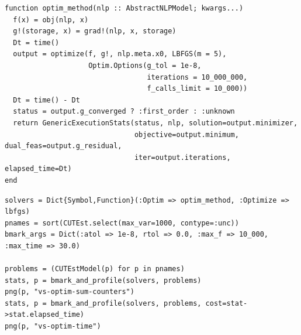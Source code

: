 \begin{frame}
\begin{lstlisting}
function optim_method(nlp :: AbstractNLPModel; kwargs...)
  f(x) = obj(nlp, x)
  g!(storage, x) = grad!(nlp, x, storage)
  Dt = time()
  output = optimize(f, g!, nlp.meta.x0, LBFGS(m = 5),
                    Optim.Options(g_tol = 1e-8,
                                  iterations = 10_000_000,
                                  f_calls_limit = 10_000))
  Dt = time() - Dt
  status = output.g_converged ? :first_order : :unknown
  return GenericExecutionStats(status, nlp, solution=output.minimizer,
                               objective=output.minimum, dual_feas=output.g_residual,
                               iter=output.iterations, elapsed_time=Dt)
end
\end{lstlisting}
\end{frame}

\begin{frame}
\begin{lstlisting}
solvers = Dict{Symbol,Function}(:Optim => optim_method, :Optimize => lbfgs)
pnames = sort(CUTEst.select(max_var=1000, contype=:unc))
bmark_args = Dict(:atol => 1e-8, rtol => 0.0, :max_f => 10_000, :max_time => 30.0)

problems = (CUTEstModel(p) for p in pnames)
stats, p = bmark_and_profile(solvers, problems)
png(p, "vs-optim-sum-counters")
stats, p = bmark_and_profile(solvers, problems, cost=stat->stat.elapsed_time)
png(p, "vs-optim-time")
\end{lstlisting}
\end{frame}

